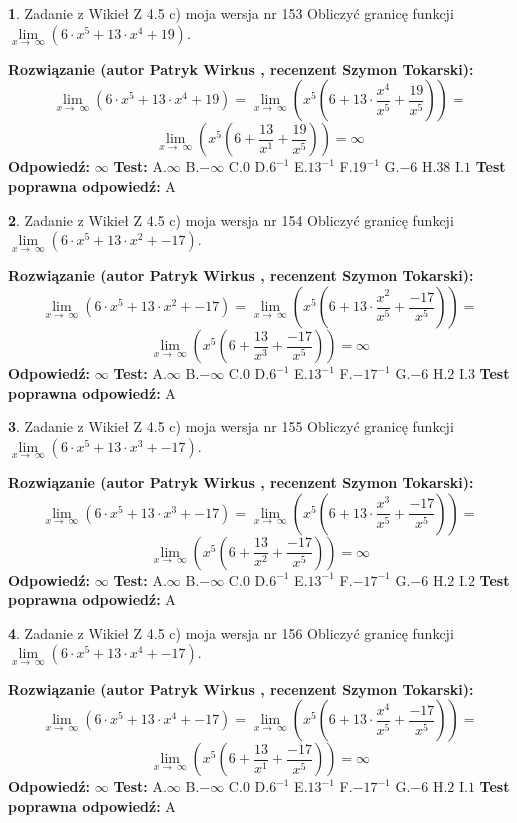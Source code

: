 \documentclass[12pt, a4paper]{article}
\theoremstyle{definition} %
\newtheorem{zad}{}
\newcommand{\zadStart}[1]{\begin{zad}#1\newline}
\newcommand{\zadStop}{\end{zad}}
\newcommand{\rozwStart}[2]{\noindent \textbf{Rozwiązanie (autor #1 , recenzent #2): }\newline}
\newcommand{\rozwStop}{\newline}
\newcommand{\odpStart}{\noindent \textbf{Odpowiedź:}\newline}
\newcommand{\odpStop}{\newline}
\newcommand{\testStart}{\noindent \textbf{Test:}\newline}
\newcommand{\testStop}{\newline}
\newcommand{\kluczStart}{\noindent \textbf{Test poprawna odpowiedź:}\newline}
\newcommand{\kluczStop}{\newline}
\begin{document}
\zadStart{Zadanie z Wikieł Z 4.5 c) moja wersja nr 153}
Obliczyć granicę funkcji  $\lim\limits_{x\to\ \infty}(6 \cdot x^{5}+13 \cdot x^{4}+19)$.
\zadStop
\rozwStart{Patryk Wirkus}{Szymon Tokarski}
$$\lim\limits_{x\to\ \infty}(6 \cdot x^{5}+13 \cdot x^{4}+19) = \lim\limits_{x\to\ \infty}(x^{5}(6 +13 \cdot \frac{x^{4}}{x^{5}}+\frac{19}{x^{5}})) =$$ $$\lim\limits_{x\to\ \infty}(x^{5}(6 +\frac{13}{x^{1}}+\frac{19}{x^{5}})) =\infty$$
\rozwStop
\odpStart
$\infty$
\odpStop
\testStart
A.$\infty$ B.$-\infty$ C.$0$ D.$6^{-1}$ E.$13^{-1}$
F.$19^{-1}$ G.$-6$
H.$38$
I.$1$
\testStop
\kluczStart
A
\kluczStop



\zadStart{Zadanie z Wikieł Z 4.5 c) moja wersja nr 154}
Obliczyć granicę funkcji  $\lim\limits_{x\to\ \infty}(6 \cdot x^{5}+13 \cdot x^{2}+-17)$.
\zadStop
\rozwStart{Patryk Wirkus}{Szymon Tokarski}
$$\lim\limits_{x\to\ \infty}(6 \cdot x^{5}+13 \cdot x^{2}+-17) = \lim\limits_{x\to\ \infty}(x^{5}(6 +13 \cdot \frac{x^{2}}{x^{5}}+\frac{-17}{x^{5}})) =$$ $$\lim\limits_{x\to\ \infty}(x^{5}(6 +\frac{13}{x^{3}}+\frac{-17}{x^{5}})) =\infty$$
\rozwStop
\odpStart
$\infty$
\odpStop
\testStart
A.$\infty$ B.$-\infty$ C.$0$ D.$6^{-1}$ E.$13^{-1}$
F.$-17^{-1}$ G.$-6$
H.$2$
I.$3$
\testStop
\kluczStart
A
\kluczStop



\zadStart{Zadanie z Wikieł Z 4.5 c) moja wersja nr 155}
Obliczyć granicę funkcji  $\lim\limits_{x\to\ \infty}(6 \cdot x^{5}+13 \cdot x^{3}+-17)$.
\zadStop
\rozwStart{Patryk Wirkus}{Szymon Tokarski}
$$\lim\limits_{x\to\ \infty}(6 \cdot x^{5}+13 \cdot x^{3}+-17) = \lim\limits_{x\to\ \infty}(x^{5}(6 +13 \cdot \frac{x^{3}}{x^{5}}+\frac{-17}{x^{5}})) =$$ $$\lim\limits_{x\to\ \infty}(x^{5}(6 +\frac{13}{x^{2}}+\frac{-17}{x^{5}})) =\infty$$
\rozwStop
\odpStart
$\infty$
\odpStop
\testStart
A.$\infty$ B.$-\infty$ C.$0$ D.$6^{-1}$ E.$13^{-1}$
F.$-17^{-1}$ G.$-6$
H.$2$
I.$2$
\testStop
\kluczStart
A
\kluczStop



\zadStart{Zadanie z Wikieł Z 4.5 c) moja wersja nr 156}
Obliczyć granicę funkcji  $\lim\limits_{x\to\ \infty}(6 \cdot x^{5}+13 \cdot x^{4}+-17)$.
\zadStop
\rozwStart{Patryk Wirkus}{Szymon Tokarski}
$$\lim\limits_{x\to\ \infty}(6 \cdot x^{5}+13 \cdot x^{4}+-17) = \lim\limits_{x\to\ \infty}(x^{5}(6 +13 \cdot \frac{x^{4}}{x^{5}}+\frac{-17}{x^{5}})) =$$ $$\lim\limits_{x\to\ \infty}(x^{5}(6 +\frac{13}{x^{1}}+\frac{-17}{x^{5}})) =\infty$$
\rozwStop
\odpStart
$\infty$
\odpStop
\testStart
A.$\infty$ B.$-\infty$ C.$0$ D.$6^{-1}$ E.$13^{-1}$
F.$-17^{-1}$ G.$-6$
H.$2$
I.$1$
\testStop
\kluczStart
A
\kluczStop
\end{document}
